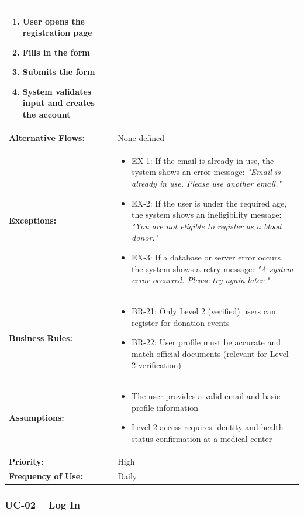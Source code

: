 \documentclass[12pt,a4paper]{article}
\begin{document}
\begin{longtable}{|p{4.5cm}|p{10.5cm}|}
\begin{enumerate}
  \item User opens the registration page
  \item Fills in the form
  \item Submits the form
  \item System validates input and creates the account
\end{enumerate} \\
\hline
\textbf{Alternative Flows:} & None defined \\
\hline
\textbf{Exceptions:} &
\begin{itemize}
  \item EX-1: If the email is already in use, the system shows an error message: \textit{"Email is already in use. Please use another email."}
  \item EX-2: If the user is under the required age, the system shows an ineligibility message: \textit{"You are not eligible to register as a blood donor."}
  \item EX-3: If a database or server error occurs, the system shows a retry message: \textit{"A system error occurred. Please try again later."}
\end{itemize} \\
\hline
\textbf{Business Rules:} &
\begin{itemize}
  \item BR-21: Only Level 2 (verified) users can register for donation events
  \item BR-22: User profile must be accurate and match official documents (relevant for Level 2 verification)
\end{itemize} \\
\hline
\textbf{Assumptions:} &
\begin{itemize}
  \item The user provides a valid email and basic profile information
  \item Level 2 access requires identity and health status confirmation at a medical center
\end{itemize} \\
\hline
\textbf{Priority:} & High \\
\hline
\textbf{Frequency of Use:} & Daily \\
\hline
\end{longtable}





\subsubsection{UC-02 – Log In}
\end{document}
